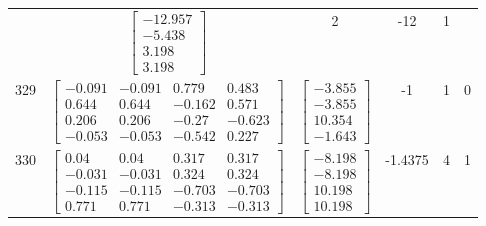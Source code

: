 \documentclass[a4paper,12pt]{article}
\begin{document}
\begin{tabular}{c c c c c c}
&
$\begin{bmatrix} -12.957 \\ -5.438 \\ 3.198 \\ 3.198 \end{bmatrix}$
&
2
&
-12
&
1
\\
329
&
$\begin{bmatrix} -0.091 & -0.091 & 0.779 & 0.483 \\ 0.644 & 0.644 & -0.162 & 0.571 \\ 0.206 & 0.206 & -0.27 & -0.623 \\ -0.053 & -0.053 & -0.542 & 0.227 \end{bmatrix}$
&
$\begin{bmatrix} -3.855 \\ -3.855 \\ 10.354 \\ -1.643 \end{bmatrix}$
&
-1
&
1
&
0
\\
330
&
$\begin{bmatrix} 0.04 & 0.04 & 0.317 & 0.317 \\ -0.031 & -0.031 & 0.324 & 0.324 \\ -0.115 & -0.115 & -0.703 & -0.703 \\ 0.771 & 0.771 & -0.313 & -0.313 \end{bmatrix}$
&
$\begin{bmatrix} -8.198 \\ -8.198 \\ 10.198 \\ 10.198 \end{bmatrix}$
&
-1.4375
&
4
&
1
\\
\end{tabular} \egroup \newpage
\end{document}
